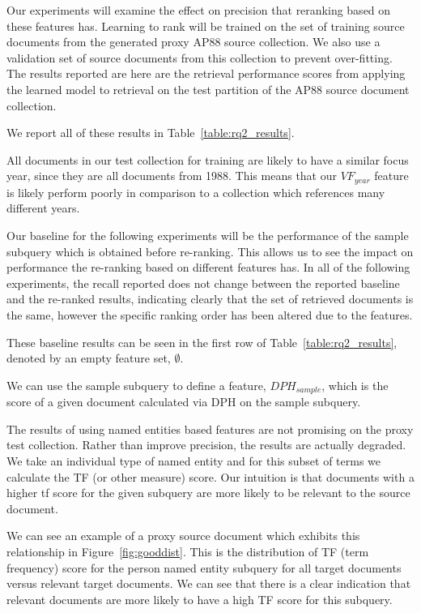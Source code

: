 \documentclass{mpaper}
\begin{document}
Our experiments will examine the effect on precision that reranking based on these features has. Learning to rank will be trained on the set of training source documents from the generated proxy AP88 source collection. We also use a validation set of source documents from this collection to prevent over-fitting.
The results reported are here are the retrieval performance scores from applying the learned model to retrieval on the test partition of the AP88 source document collection.

We report all of these results in Table~\ref{table:rq2_results}.

All documents in our test collection for training are likely to have a similar focus year, since they are all documents from 1988. This means that our $VF_{year}$ feature is likely perform poorly in comparison to a collection which references many different years.

Our baseline for the following experiments will be the performance of the sample subquery which is obtained before re-ranking. This allows us to see the impact on performance the re-ranking based on different features has.
In all of the following experiments, the recall reported does not change between the reported baseline and the re-ranked results, indicating clearly that the set of retrieved documents is the same, however the specific ranking order has been altered due to the features.

These baseline results can be seen in the first row of Table~\ref{table:rq2_results}, denoted by an empty feature set, $\emptyset$.

We can use the sample subquery to define a feature, $DPH_{sample}$, which is the score of a given document calculated via DPH on the sample subquery.

The results of using named entities based features are not promising on the proxy test collection.
Rather than improve precision, the results are actually degraded.
We take an individual type of named entity and for this subset of terms we calculate the TF (or other measure) score.
Our intuition is that documents with a higher tf score for the given subquery are more likely to be relevant to the source document.

We can see an example of a proxy source document which exhibits this relationship in Figure~\ref{fig:gooddist}. This is the distribution of TF (term frequency) score for the person named entity subquery for all target documents versus relevant target documents. We can see that there is a clear indication that relevant documents are more likely to have a high TF score for this subquery.
\end{document}
